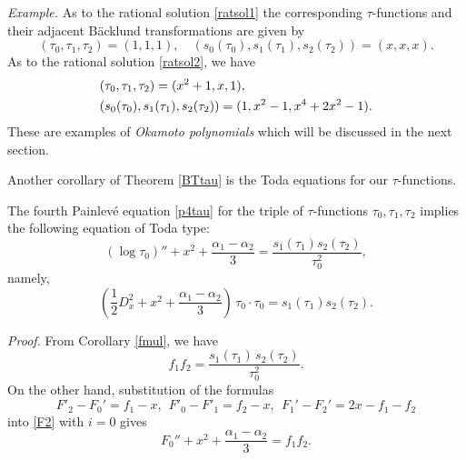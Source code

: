 \par\medskip\noindent 
{\em Example.}  As to the rational solution \eqref{ratsol1}
the corresponding $\tau$-functions and their adjacent B\"acklund 
transformations are given by
\begin{equation}
(\tau_0,\tau_1,\tau_2)=(1,1,1), \quad
(s_0(\tau_0),s_1(\tau_1),s_2(\tau_2))=
(x,x,x). 
\end{equation}
As to the rational solution \eqref{ratsol2}, we have 
\begin{equation}
\begin{align}
&(\tau_0,\tau_1,\tau_2)=(x^2+1,x,1), \\
&(s_0(\tau_0),s_1(\tau_1),s_2(\tau_2))=
(1,x^2-1,x^4+2 x^2-1).  \notag
\end{align}
\end{equation} 
These are examples of {\em Okamoto polynomials} which will be discussed 
in the next section. 
\par\medskip
Another corollary of Theorem \ref{BTtau} is the Toda equations 
for our $\tau$-functions. 
\begin{cor}\label{Toda0}
The fourth Painlev\'e equation \eqref{p4tau} for the triple of 
$\tau$-functions $\tau_0,\tau_1,\tau_2$ implies the following 
equation of Toda type: 
\begin{equation}
(\log \tau_0)''+x^2+\frac{\alpha_1-\alpha_2}{3}
=\frac{s_1(\tau_1) s_2(\tau_2)}{\tau_0^2},
\end{equation}
namely,
\begin{equation}
(\frac{1}{2}D_x^2 +x^2+\frac{\alpha_1-\alpha_2}{3})\,\tau_0\cdot\tau_0
=s_1(\tau_1) s_2(\tau_2).
\end{equation}
\end{cor}
\par\noindent
{\em Proof.}  \quad From Corollary \ref{fmul}, we have
\begin{equation}\label{fttt}
f_1 f_2 =\frac{s_1(\tau_1)\,s_2(\tau_2)}{\tau_0^2}. 
\end{equation}
On the other hand, substitution of the formulas
\begin{equation}
F'_2-F_0'=f_1-x,\ \  F'_0-F'_1=f_2-x,\ \ F_1'-F_2'=2x-f_1-f_2 
\end{equation}
into \eqref{F2} with $i=0$ gives 
\begin{equation}\label{F2f}
F_0''+x^2+\frac{\alpha_1-\alpha_2}{3}=f_1f_2. 
\end{equation}
